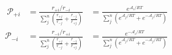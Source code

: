 \begin{eqnarray}\
{\mathcal P}_{+i}  & =  \frac{r_{+i}/r_{-i}}{\sum_j^n\left(\frac{r_{+j}}{r_{-j}} + \frac{r_{-j}}{r_{+j}}  \right)} & =  \frac{e^{\mathcal A_i/RT}}{\sum_j^n \left( e^{\mathcal A_j/RT} + e^{-\mathcal A_j/RT}\right)} \\
{\mathcal P}_{-i}  & =  \frac{r_{-i}/r_{+i}}{\sum_j^n\left(\frac{r_{+j}}{r_{-j}} + \frac{r_{-j}}{r_{+j}}  \right)} & =  \frac{e^{-\mathcal A_i/RT}}{\sum_j^n \left(e^{\mathcal A_j/RT} + e^{-\mathcal A_j/RT}\right)} \\
\end{eqnarray}